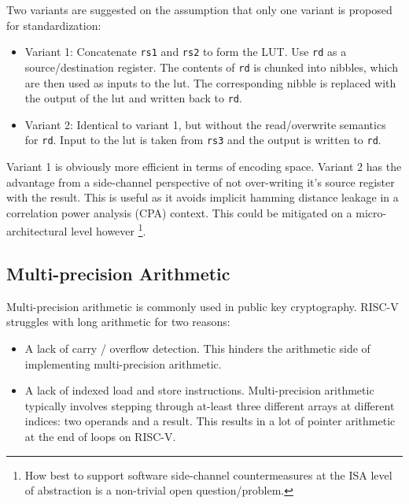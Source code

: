 Two variants are suggested on the assumption that only one variant is
proposed for standardization:
\begin{itemize}
\item Variant 1: Concatenate {\tt rs1} and {\tt rs2} to form the LUT.
    Use {\tt rd} as a source/destination register.
    The contents of {\tt rd} is chunked into nibbles, which are then
    used as inputs to the lut. The corresponding nibble is replaced
    with the output of the lut and written back to {\tt rd}.
\item Variant 2: Identical to variant 1, but without the read/overwrite
    semantics for {\tt rd}. Input to the lut is taken from {\tt rs3}
    and the output is written to {\tt rd}.
\end{itemize}
Variant 1 is obviously more efficient in terms of encoding space.
Variant 2 has the advantage from a side-channel perspective
of not over-writing it's source register with the result.
This is useful as it avoids implicit hamming distance leakage in
a correlation power analysis (CPA) context. This could be mitigated
on a micro-architectural level however
\footnote{
    How best to support software side-channel countermeasures at the
    ISA level of abstraction is a non-trivial open question/problem.
}.


\subsection{Multi-precision Arithmetic}

Multi-precision arithmetic is commonly used in public key cryptography.
RISC-V struggles with long arithmetic for two reasons:

\begin{itemize}
\item A lack of carry / overflow detection. This hinders the arithmetic
    side of implementing multi-precision arithmetic.

\item A lack of indexed load and store instructions.
    Multi-precision arithmetic typically involves stepping through
    at-least three different arrays at different indices: two operands
    and a result.
    This results in a lot of pointer arithmetic at the end of loops
    on RISC-V.
\end{itemize}


